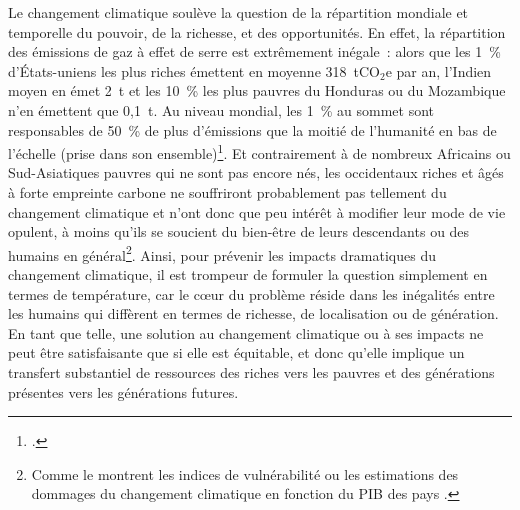 \documentclass[a5paper,french,openany]{memoir}
\begin{document}
Le changement climatique soulève la question de la répartition mondiale et temporelle du pouvoir, de la richesse, et des opportunités. %
En effet, la répartition des émissions de gaz à effet de serre est extrêmement inégale~: alors que les 1~\% d'États-uniens les plus riches émettent en moyenne 318~tCO$_\text{2}$e par an, l'Indien moyen en émet 2~t et les 10~\% les plus pauvres du Honduras ou du Mozambique n'en émettent que 0,1~t. %
Au niveau mondial, les 1~\% au sommet sont responsables de 50~\% de plus d'émissions que la moitié de l'humanité en bas de l'échelle (prise dans son ensemble)\footnote{\cite{chancel_carbon_2015,bruckner_impacts_2022}.}. 
Et contrairement à de nombreux Africains ou Sud-Asiatiques pauvres qui ne sont pas encore nés, les occidentaux riches et âgés à forte empreinte carbone ne souffriront probablement pas tellement du changement climatique et n'ont donc que peu intérêt à modifier leur mode de vie opulent, à moins qu'ils se soucient du bien-être de leurs descendants ou des humains en général\footnote{Comme le montrent les indices de vulnérabilité \citep{chen_university_2015} ou les estimations des dommages du changement climatique en fonction du PIB des pays \citep{burke_global_2015}.}. 
Ainsi, pour prévenir les impacts dramatiques du changement climatique, il est trompeur de formuler la question simplement en termes de température, %
car le cœur du problème réside dans les inégalités entre les humains qui diffèrent en termes de richesse, de localisation ou de génération. En tant que telle, une solution au changement climatique ou à ses impacts ne peut être satisfaisante que si elle est équitable, et donc qu'elle implique un transfert substantiel de ressources des riches vers les pauvres et des générations présentes vers les générations futures.%

\end{document}
